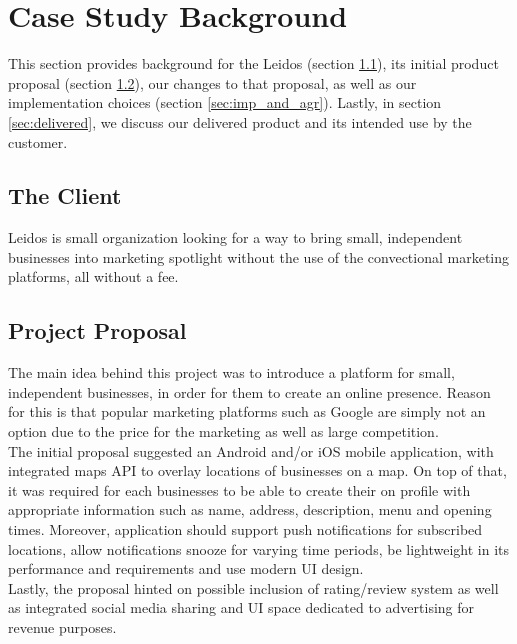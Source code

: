 \documentclass{l3proj}
\begin{document}
\section{Case Study Background}
\label{sec:background}
    This section provides background for the Leidos (section \ref{sec:client}), its initial product proposal (section \ref{sec:proposal}), our changes to that proposal, as well as our implementation choices (section \ref{sec:imp_and_agr}). Lastly, in section \ref{sec:delivered}, we discuss our delivered product and its intended use by the customer.
    
    \subsection{The Client}
    \label{sec:client}
        Leidos is small organization looking for a way to bring small, independent businesses into marketing spotlight without the use of the convectional marketing platforms, all without a fee.
        
    \subsection{Project Proposal}
    \label{sec:proposal}
        The main idea behind this project was to introduce a platform for small, independent businesses, in order for them to create an online presence. Reason for this is that popular marketing platforms such as Google are simply not an option due to the price for the marketing as well as large competition.\\
        \newline
        The initial proposal suggested an Android and/or iOS mobile application, with integrated maps API to overlay locations of businesses on a map. On top of that, it was required for each businesses to be able to create their on profile with appropriate information such as name, address, description, menu and opening times. Moreover, application should support push notifications for subscribed locations, allow notifications snooze for varying time periods, be lightweight in its performance and requirements and use modern UI design.\\
        Lastly, the proposal hinted on possible inclusion of rating/review system as well as integrated social media sharing and UI space dedicated to advertising for revenue purposes.
\end{document}
